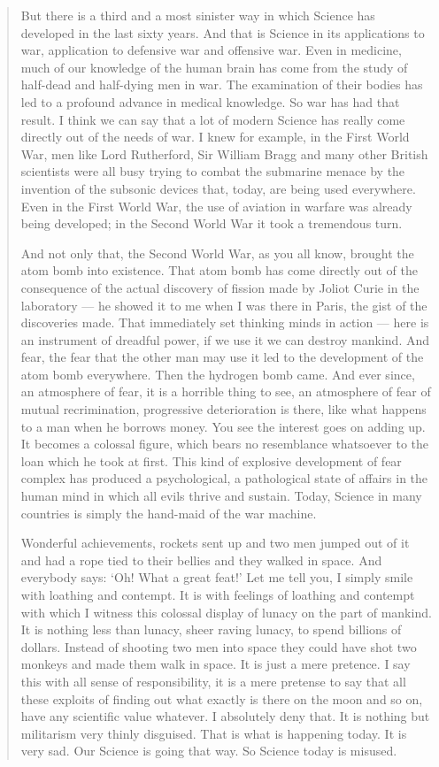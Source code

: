 \begin{quote}
{But there is a third and a most sinister way in which Science has developed in the last sixty years. And that is Science in its applications to war, application to defensive war and offensive war. Even in medicine, much of our knowledge of the human brain has come from the study of half-dead and half-dying men in war. The examination of their bodies has led to a profound advance in medical knowledge. So war has had that result. I think we can say that a lot of modern Science has really come directly out of the needs of war. I knew for example, in the First World War, men like Lord Rutherford, Sir William Bragg and many other British scientists were all busy trying to combat the submarine menace by the invention of the subsonic devices that, today, are being used everywhere. Even in the First World War, the use of aviation in warfare was already being developed; in the Second World War it took a tremendous turn.}

{\fontsize{10pt}{12}\selectfont And not only that, the Second World War, as you all know, brought the atom bomb into existence. That atom bomb has come directly out of the consequence of the actual discovery of fission made by Joliot Curie in the laboratory --- he showed it to me when I was there in Paris, the gist of the discoveries made. That immediately set thinking minds in action --- here is an instrument of dreadful power, if we use it we can destroy mankind. And fear, the fear that the other man may use it led to the development of the atom bomb everywhere. Then the hydrogen bomb came. And ever since, an atmosphere of fear, it is a horrible thing to see, an atmosphere of fear of mutual recrimination, progressive deterioration is there, like what happens to a man when he borrows money. You see the interest goes on adding up. It becomes a colossal figure, which bears no resemblance whatsoever to the loan which he took at first. This kind of explosive development of fear complex has produced a psychological, a pathological state of affairs in the human mind in which all evils thrive and sustain. Today, Science in many countries is simply the hand-maid of the war machine.

Wonderful achievements, rockets sent up and two men jumped out of it and had a rope tied to their bellies and they walked in space. And everybody says: `Oh! What a great feat!' Let me tell you, I simply smile with loathing and contempt. It is with feelings of loathing and contempt with which I witness this colossal display of lunacy on the part of mankind. It is nothing less than lunacy, sheer raving lunacy, to spend billions of dollars. Instead of shooting two men into space they could have shot two monkeys and made them walk in space. It is just a mere pretence. I say this with all sense of responsibility, it is a mere pretense to say that all these exploits of finding out what exactly is there on the moon and so on, have any scientific value whatever. I absolutely deny that. It is nothing but militarism very thinly disguised. That is what is happening today. It is very sad. Our Science is going that way. So Science today is misused.

}
\end{quote}

